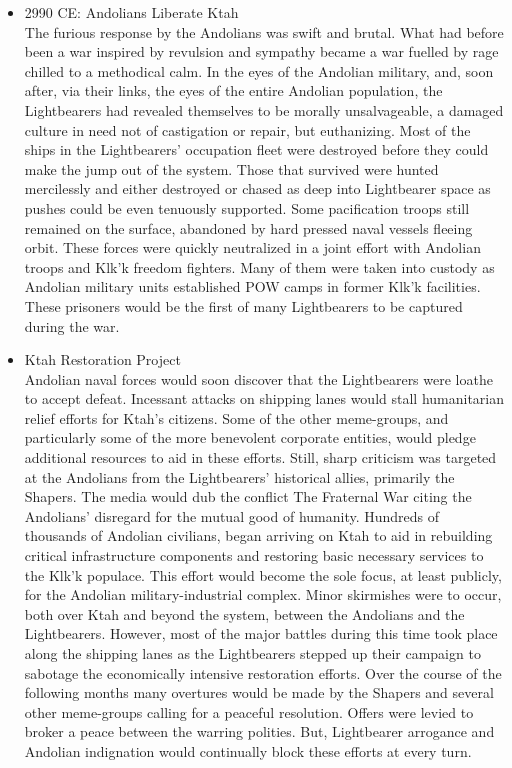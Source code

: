\begin{itemize}
\item 2990 CE: Andolians Liberate Ktah\\

The furious response by the Andolians was swift and brutal. What had
before been a war inspired by revulsion and sympathy became a war
fuelled by rage chilled to a methodical calm. In the eyes of the
Andolian military, and, soon after, via their links, the eyes of the
entire Andolian population, the Lightbearers had revealed themselves
to be morally unsalvageable, a damaged culture in need not of
castigation or repair, but euthanizing. Most of the ships in the
Lightbearers' occupation fleet were destroyed before they could make
the jump out of the system.  Those that survived were hunted
mercilessly and either destroyed or chased as deep into Lightbearer
space as pushes could be even tenuously supported.  Some pacification
troops still remained on the surface, abandoned by hard pressed naval
vessels fleeing orbit.  These forces were quickly neutralized in a
joint effort with Andolian troops and Klk'k freedom fighters.  Many of
them were taken into custody as Andolian military units established
POW camps in former Klk'k facilities.  These prisoners would be the
first of many Lightbearers to be captured during the war.

\item Ktah Restoration Project \\

Andolian naval forces would soon discover that the Lightbearers were
loathe to accept defeat.  Incessant attacks on shipping lanes would
stall humanitarian relief efforts for Ktah's citizens.  Some of the
other meme-groups, and particularly some of the more benevolent
corporate entities, would pledge additional resources to aid in these
efforts.  Still, sharp criticism was targeted at the Andolians from
the Lightbearers' historical allies, primarily the Shapers.  The media
would dub the conflict The Fraternal War citing the Andolians'
disregard for the mutual good of humanity.  Hundreds of thousands of
Andolian civilians, began arriving on Ktah to aid in rebuilding
critical infrastructure components and restoring basic necessary
services to the Klk'k populace.  This effort would become the sole
focus, at least publicly, for the Andolian military-industrial
complex.  Minor skirmishes were to occur, both over Ktah and beyond
the system, between the Andolians and the Lightbearers.  However, most
of the major battles during this time took place along the shipping
lanes as the Lightbearers stepped up their campaign to sabotage the
economically intensive restoration efforts.  Over the course of the
following months many overtures would be made by the Shapers and
several other meme-groups calling for a peaceful resolution.  Offers
were levied to broker a peace between the warring polities.  But,
Lightbearer arrogance and Andolian indignation would continually block
these efforts at every turn.


\end{itemize}
